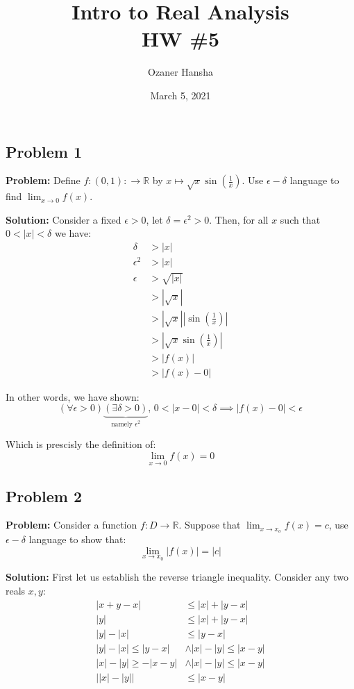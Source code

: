 \documentclass{article}
\newcommand{\R}{\mathbb R}
\begin{document}
\title{Intro to Real Analysis\\HW \#5}
\author{Ozaner Hansha}
\date{March 5, 2021}
\maketitle

\subsection*{Problem 1}
\noindent\textbf{Problem:} Define $f:(0,1):\to\R$ by $x\mapsto\sqrt{x}\sin\left(\frac{1}{x}\right)$. Use $\epsilon-\delta$ language to find $\lim_{x\to0}f(x)$.
\bigskip

\noindent\textbf{Solution:} Consider a fixed $\epsilon>0$, let $\delta=\epsilon^2>0$. Then, for all $x$ such that $0<|x|<\delta$ we have:
\begin{align*}
  \delta&>|x|\tag{hypothesis}\\
  \epsilon^2&>|x|\tag{def. of $\delta$}\\
  \epsilon&>\sqrt{|x|}\\
  &>|\sqrt{x}|\tag{$\forall x\in(0,1),\,x>0$}\\
  &>|\sqrt{x}|\left|\sin\left(\frac{1}{x}\right)\right|\tag{$\forall c\in\R,\,0\le|\sin c|\le 1$}\\
  &>\left|\sqrt{x}\sin\left(\frac{1}{x}\right)\right|\\
  &>|f(x)|\tag{def. of $f(x)$}\\
  &>|f(x)-0|
\end{align*}

In other words, we have shown:
\begin{equation*}
  (\forall \epsilon>0)\underbrace{(\exists\delta>0)}_{\text{namely }\epsilon^2},\,0<|x-0|<\delta\implies|f(x)-0|<\epsilon
\end{equation*}

Which is prescisly the definition of:
\begin{equation*}
  \lim_{x\to0}f(x)=0
\end{equation*}

\subsection*{Problem 2}
\noindent\textbf{Problem:} Consider a function $f:D\to\R$. Suppose that $\lim_{x\to x_o}f(x)=c$, use $\epsilon-\delta$ language to show that: 
$$\lim_{x\to x_0}|f(x)|=|c|$$

\noindent\textbf{Solution:} First let us establish the reverse triangle inequality. Consider any two reals $x,y$:
\begin{align*}
  |x+y-x|&\le|x|+|y-x|\tag{triangle inequality}\\
  |y|&\le|x|+|y-x|\\
  |y|-|x|&\le|y-x|\\
  |y|-|x|\le|y-x|&\wedge|x|-|y|\le|x-y|\tag{$x$ and $y$ are indistinguishable}\\
  |x|-|y|\ge-|x-y|&\wedge|x|-|y|\le|x-y|\\
  \left||x|-|y|\right|&\le|x-y|\tag{reverse triangle inequality}
\end{align*}
\end{document}
